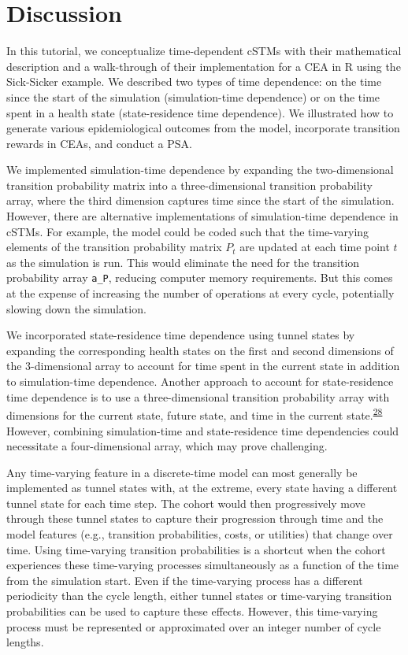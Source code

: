 \documentclass[
]{article}
\begin{document}
\hypertarget{discussion}{%
\section{Discussion}\label{discussion}}

In this tutorial, we conceptualize time-dependent cSTMs with their mathematical description and a walk-through of their implementation for a CEA in R using the Sick-Sicker example. We described two types of time dependence: on the time since the start of the simulation (simulation-time dependence) or on the time spent in a health state (state-residence time dependence). We illustrated how to generate various epidemiological outcomes from the model, incorporate transition rewards in CEAs, and conduct a PSA.

We implemented simulation-time dependence by expanding the two-dimensional transition probability matrix into a three-dimensional transition probability array, where the third dimension captures time since the start of the simulation. However, there are alternative implementations of simulation-time dependence in cSTMs. For example, the model could be coded such that the time-varying elements of the transition probability matrix \(P_t\) are updated at each time point \(t\) as the simulation is run. This would eliminate the need for the transition probability array \texttt{a\_P}, reducing computer memory requirements. But this comes at the expense of increasing the number of operations at every cycle, potentially slowing down the simulation.

We incorporated state-residence time dependence using tunnel states by expanding the corresponding health states on the first and second dimensions of the 3-dimensional array to account for time spent in the current state in addition to simulation-time dependence. Another approach to account for state-residence time dependence is to use a three-dimensional transition probability array with dimensions for the current state, future state, and time in the current state.\textsuperscript{\protect\hyperlink{ref-Hawkins2005}{28}} However, combining simulation-time and state-residence time dependencies could necessitate a four-dimensional array, which may prove challenging.

Any time-varying feature in a discrete-time model can most generally be implemented as tunnel states with, at the extreme, every state having a different tunnel state for each time step. The cohort would then progressively move through these tunnel states to capture their progression through time and the model features (e.g., transition probabilities, costs, or utilities) that change over time. Using time-varying transition probabilities is a shortcut when the cohort experiences these time-varying processes simultaneously as a function of the time from the simulation start. Even if the time-varying process has a different periodicity than the cycle length, either tunnel states or time-varying transition probabilities can be used to capture these effects. However, this time-varying process must be represented or approximated over an integer number of cycle lengths.
\end{document}
